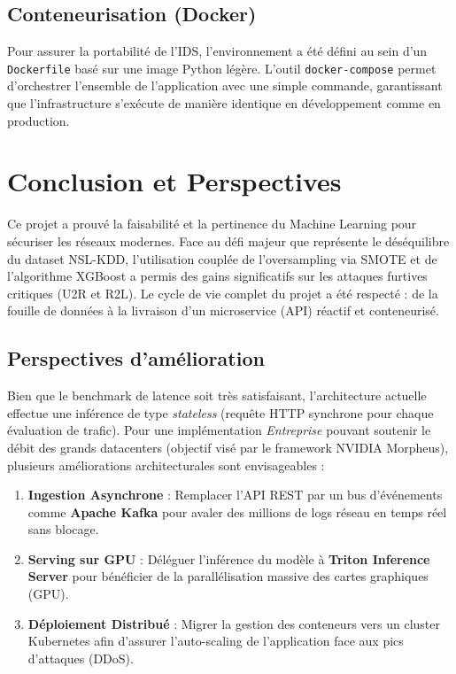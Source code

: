 \documentclass[12pt,a4paper]{report}
\begin{document}
\section{Conteneurisation (Docker)}
Pour assurer la portabilité de l'IDS, l'environnement a été défini au sein d'un \texttt{Dockerfile} basé sur une image Python légère. L'outil \texttt{docker-compose} permet d'orchestrer l'ensemble de l'application avec une simple commande, garantissant que l'infrastructure s'exécute de manière identique en développement comme en production.

\chapter{Conclusion et Perspectives}

Ce projet a prouvé la faisabilité et la pertinence du Machine Learning pour sécuriser les réseaux modernes. Face au défi majeur que représente le déséquilibre du dataset NSL-KDD, l'utilisation couplée de l'oversampling via SMOTE et de l'algorithme XGBoost a permis des gains significatifs sur les attaques furtives critiques (U2R et R2L). Le cycle de vie complet du projet a été respecté : de la fouille de données à la livraison d'un microservice (API) réactif et conteneurisé.

\section*{Perspectives d'amélioration}
Bien que le benchmark de latence soit très satisfaisant, l'architecture actuelle effectue une inférence de type \textit{stateless} (requête HTTP synchrone pour chaque évaluation de trafic).
Pour une implémentation \textit{Entreprise} pouvant soutenir le débit des grands datacenters (objectif visé par le framework NVIDIA Morpheus), plusieurs améliorations architecturales sont envisageables :
\begin{enumerate}
    \item \textbf{Ingestion Asynchrone} : Remplacer l'API REST par un bus d'événements comme \textbf{Apache Kafka} pour avaler des millions de logs réseau en temps réel sans blocage.
    \item \textbf{Serving sur GPU} : Déléguer l'inférence du modèle à \textbf{Triton Inference Server} pour bénéficier de la parallélisation massive des cartes graphiques (GPU).
    \item \textbf{Déploiement Distribué} : Migrer la gestion des conteneurs vers un cluster Kubernetes afin d'assurer l'auto-scaling de l'application face aux pics d'attaques (DDoS).
\end{enumerate}
\end{document}
